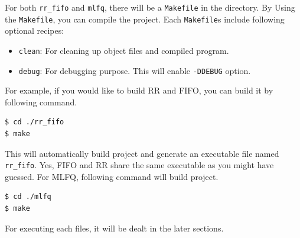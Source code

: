 \documentclass{homework}
\begin{document}
For both \texttt{rr_fifo} and \texttt{mlfq}, there will be a \texttt{Makefile} in the directory. By Using the \texttt{Makefile}, you can compile the project. Each \texttt{Makefile}s include following optional recipes:

\begin{itemize}
   \item \texttt{clean}: For cleaning up object files and compiled program.
   \item \texttt{debug}: For debugging purpose. This will enable \texttt{-DDEBUG} option.
\end{itemize}

For example, if you would like to build RR and FIFO, you can build it by following command.
\\
\begin{center}
\begin{code}
\begin{verbatim}
$ cd ./rr_fifo
$ make 
\end{verbatim}
\end{code}
\end{center}

This will automatically build project and generate an executable file named \texttt{rr_fifo}. Yes, FIFO and RR share the same executable as you might have guessed. For MLFQ, following command will build project.
\\
\begin{center}
\begin{code}
\begin{verbatim}
$ cd ./mlfq
$ make 
\end{verbatim}
\end{code}
\end{center}

For executing each files, it will be dealt in the later sections.
\pagebreak
\end{document}
